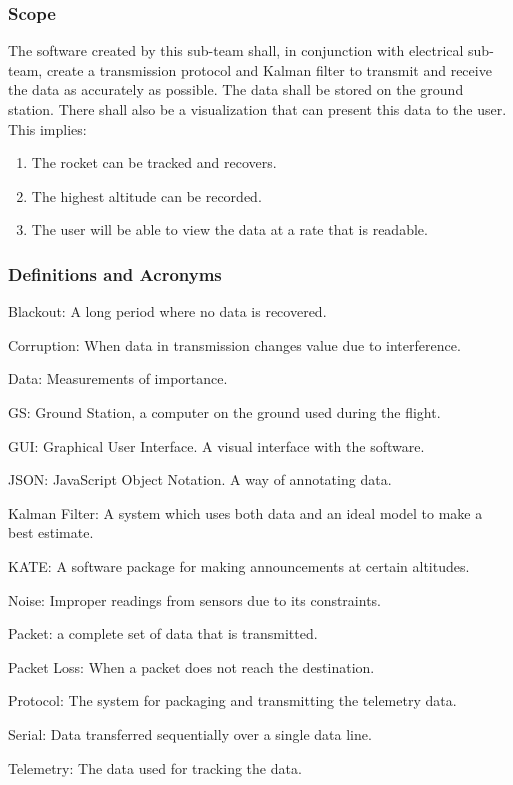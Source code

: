 \documentclass[onecolumn, draftclsnofoot,10pt, compsoc]{IEEEtran}
\begin{document}
\subsubsection{Scope}
The software created by this sub-team shall, in conjunction with electrical sub-
team, create a transmission protocol and Kalman filter to transmit and receive the data as
accurately as possible. The data shall be stored on the ground station. There shall also be a
visualization that can present this data to the user. This implies:
 \begin{enumerate}
    \item The rocket can be tracked and recovers.
    \item The highest altitude can be recorded.
    \item The user will be able to view the data at a rate that is readable.
 \end{enumerate}
\subsubsection{Definitions and Acronyms}
Blackout: A long period where no data is recovered. \par
Corruption: When data in transmission changes value due to interference. \par
Data: Measurements of importance. \par
GS: Ground Station, a computer on the ground used during the flight. \par
GUI: Graphical User Interface. A visual interface with the software. \par
JSON: JavaScript Object Notation. A way of annotating data. \par
Kalman Filter: A system which uses both data and an ideal model to make a best estimate. \par
KATE: A software package for making announcements at certain altitudes. \par
Noise: Improper readings from sensors due to its constraints. \par
Packet: a complete set of data that is transmitted. \par
Packet Loss: When a packet does not reach the destination. \par
Protocol: The system for packaging and transmitting the telemetry data. \par
Serial: Data transferred sequentially over a single data line. \par
Telemetry: The data used for tracking the data. \par
\end{document}
